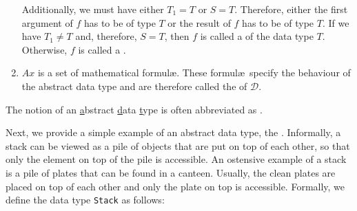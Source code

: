 \begin{enumerate}
      Additionally, we must have either $T_1 = T$ or $S = T$.  Therefore, either
      the first argument of $f$ has to be of type $T$ or the result of $f$ has to be of type 
      $T$.  If we have  $T_1 \not= T$ and, therefore, $S = T$,
      then $f$ is called a  of the data type $T$.  Otherwise,
      $f$ is called a  .
\item $Ax$ is a set of mathematical formul\ae.   These formul\ae\ 
      specify the behaviour of the abstract data type and are therefore called
      the \blue{axioms} of $\mathcal{D}$.
\end{enumerate}
The notion of an \underline{a}bstract \underline{d}ata \underline{t}ype is often abbreviated as \textsc{}.

Next, we provide a simple example of an abstract data type, the .
Informally, a stack can be viewed as a pile of objects that are put on top of each other, so that
only the element on top of the pile is accessible.  An ostensive example of a stack is a pile of
plates that can be found in a canteen.  Usually, the clean plates are placed on top of each other
and only the plate on top is accessible.  Formally, we define the data type \texttt{Stack} as follows:
